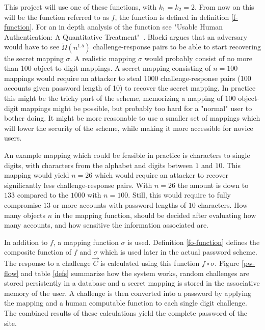 \par This project will use one of these functions, with $k_1=k_2=2$. From now on this will be the function referred to as $f$, the function is defined in definition \ref{f-function}. For an in depth analysis of the function see "Usable Human Authentication: A Quantitative Treatment"~\cite{Blocki2014}. Blocki argues that an adversary would have to see $\tilde \Omega(n^{1.5})$ challenge-response pairs to be able to start recovering the secret mapping $\sigma$. A realistic mapping $\sigma$ would probably consist of no more than 100 object to digit mappings. A secret mapping consisting of $n=100$ mappings would require an attacker to steal 1000 challenge-response pairs (100 accounts given password length of 10) to recover the secret mapping. In practice this might be the tricky part of the scheme, memorizing a mapping of $100$ object-digit mappings might be possible, but probably too hard for a "normal" user to bother doing. It might be more reasonable to use a smaller set of mappings which will lower the security of the scheme, while making it more accessible for novice users. 
\par An example mapping which could be feasible in practice is characters to single digits, with characters from the alphabet and digits between $1$ and $10$. This mapping would yield $n=26$ which would require an attacker to recover significantly less challenge-response pairs. With $n=26$ the amount is down to $133$ compared to the $1000$ with $n=100$. Still, this would require to fully compromise $13$ or more accounts with password lengths of $10$ characters. How many objects $n$ in the mapping function, should be decided after evaluating how many accounts, and how sensitive the information associated are.
\par In addition to $f$, a mapping function $\sigma$ is used. Definition \ref{fo-function} defines the composite function of $f$ and $\sigma$ which is used later in the actual password scheme. The response to a challenge $\vec C$ is calculated using this function $f \circ \sigma$. Figure \ref{pw-flow} and table \ref{defs} summarize how the system works, random challenges are stored persistently in a database and a secret mapping is stored in the associative memory of the user. A challenge is then converted into a password by applying the mapping and a human computable function to each single digit challenge. The combined results of these calculations yield the complete password of the site.



